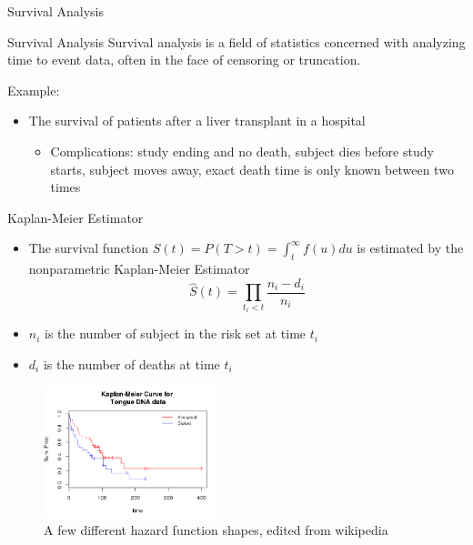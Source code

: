 \begin{frame}{Survival Analysis}
\begin{block}{Survival Analysis}
Survival analysis is a field of statistics concerned with analyzing time to 
event data, often in the face of censoring or truncation.
\end{block}
Example:
\begin{itemize}
 \item The survival of patients after a liver transplant in a hospital
 \begin{itemize}
  \item Complications: study ending and no death, subject dies before study starts,
  subject moves away, exact death time is only known between two times
 \end{itemize}

\end{itemize}
\end{frame}

\begin{frame}{Kaplan-Meier Estimator}
\begin{itemize}
 \item The survival function $S(t)=P(T>t)=\int_{t}^{\infty}f(u)du$ is estimated by the 
 nonparametric Kaplan-Meier Estimator
 $$\hat{S}(t)=\prod_{t_i<t}\frac{n_i -d_i}{n_i}$$
\item $n_i$ is the number of subject in the risk set at time $t_i$
\item $d_i$ is the number of deaths at time $t_i$
\end{itemize}
 \begin{figure}[h!]
  \centering
    \includegraphics[width=0.45\textwidth]{km_example.png}
  \caption{A few different hazard function shapes, edited from wikipedia}
\label{fig:hazard}
\end{figure}
\end{frame}

